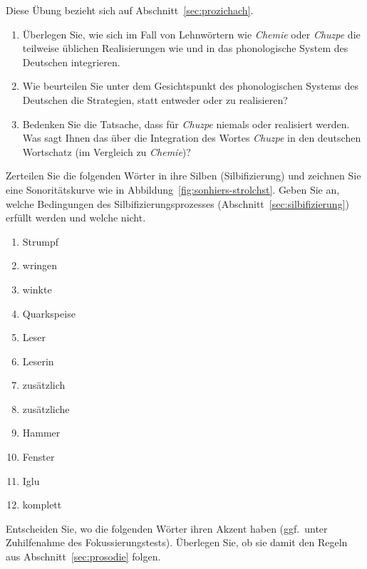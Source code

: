 \Uebung[\tristar] \label{u43} Diese Übung bezieht sich auf Abschnitt~\ref{sec:prozichach}.

\begin{enumerate}\Lf
  \item Überlegen Sie, wie sich im Fall von Lehnwörtern wie \textit{Chemie} oder \textit{Chuzpe} die teilweise üblichen Realisierungen wie \textipa{[\c{c}emi:]} und \textipa{[XU\t{ts}p@]} in das phonologische System des Deutschen integrieren.
  \item Wie beurteilen Sie unter dem Gesichtspunkt des phonologischen Systems des Deutschen die Strategien, statt \textipa{[\c{c}emi:]} entweder \textipa{[Semi:]} oder \textipa{[kemi:]} zu realisieren?
  \item Bedenken Sie die Tatsache, dass für \textit{Chuzpe} niemals \textipa{[SU\t{ts}p@]} oder \textipa{[kU\t{ts}p@]} realisiert werden.
    Was sagt Ihnen das über die Integration des Wortes \textit{Chuzpe} in den deutschen Wortschatz (im Vergleich zu \textit{Chemie})?
\end{enumerate}

\Uebung \label{u44} Zerteilen Sie die folgenden Wörter in ihre Silben (Silbifizierung) und zeichnen Sie eine Sonoritätskurve wie in Abbildung~\ref{fig:sonhiers-strolchst}.
Geben Sie an, welche Bedingungen des Silbifizierungsprozesses (Abschnitt~\ref{sec:silbifizierung}) erfüllt werden und welche nicht.

\begin{enumerate}\Lf
  \item Strumpf
  \item wringen
  \item winkte
  \item Quarkspeise
  \item Leser
  \item Leserin
  \item zusätzlich
  \item zusätzliche
  \item Hammer
  \item Fenster
  \item Iglu
  \item komplett
\end{enumerate}

\Uebung \label{u45} Entscheiden Sie, wo die folgenden Wörter ihren Akzent haben (ggf.\ unter Zuhilfenahme des Fokussierungstests).
Überlegen Sie, ob sie damit den Regeln aus Abschnitt~\ref{sec:prosodie} folgen.

